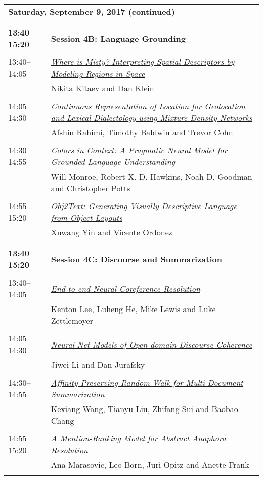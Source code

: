 \begin{tabular}{p{20mm}p{128mm}}
\\
\multicolumn{2}{l}{\bf Saturday, September 9, 2017 (continued)} \\\\
\\{\bf 13:40--15:20} & {\bf Session 4B: Language Grounding } \\
\\
13:40--14:05 & \hyperlink{page.157}{\em Where is Misty? Interpreting Spatial Descriptors by Modeling Regions in Space}\\
         & Nikita Kitaev and Dan Klein \\
\\

14:05--14:30 & \hyperlink{page.167}{\em Continuous Representation of Location for Geolocation and Lexical Dialectology using Mixture Density Networks}\\
         & Afshin Rahimi, Timothy Baldwin and Trevor Cohn \\
\\

14:30--14:55 & {\em Colors in Context: A Pragmatic Neural Model for Grounded Language Understanding}\\
         & Will Monroe, Robert X. D. Hawkins, Noah D. Goodman and Christopher Potts \\
\\

14:55--15:20 & \hyperlink{page.177}{\em Obj2Text: Generating Visually Descriptive Language from Object Layouts}\\
         & Xuwang Yin and Vicente Ordonez \\
\\

\\{\bf 13:40--15:20} & {\bf Session 4C: Discourse and Summarization } \\
\\
13:40--14:05 & \hyperlink{page.188}{\em End-to-end Neural Coreference Resolution}\\
         & Kenton Lee, Luheng He, Mike Lewis and Luke Zettlemoyer \\
\\

14:05--14:30 & \hyperlink{page.198}{\em Neural Net Models of Open-domain Discourse Coherence}\\
         & Jiwei Li and Dan Jurafsky \\
\\

14:30--14:55 & \hyperlink{page.210}{\em Affinity-Preserving Random Walk for Multi-Document Summarization}\\
         & Kexiang Wang, Tianyu Liu, Zhifang Sui and Baobao Chang \\
\\

14:55--15:20 & \hyperlink{page.221}{\em A Mention-Ranking Model for Abstract Anaphora Resolution}\\
         & Ana Marasovic, Leo Born, Juri Opitz and Anette Frank \\
\\

\end{tabular}

